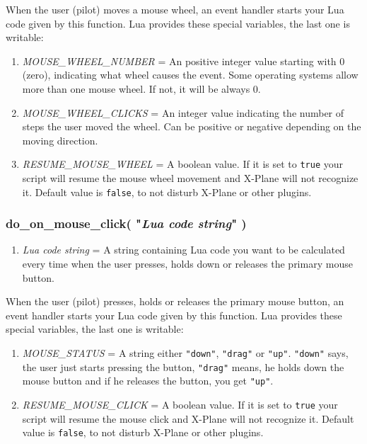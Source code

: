 \documentclass[11pt,parskip=half,a4paper]{scrartcl}
\begin{document}
When the user (pilot) moves a mouse wheel, an event handler starts your Lua code given by this function. Lua provides these special variables, the last one is writable:

\begin{enumerate}
	\item \emph{MOUSE\_WHEEL\_NUMBER} = An positive integer value starting with 0 (zero), indicating what wheel causes the event. Some operating systems allow more than one mouse wheel. If not, it will be always 0.
	\item \emph{MOUSE\_WHEEL\_CLICKS} = An integer value indicating the number of steps the user moved the wheel. Can be positive or negative depending on the moving direction.
	\item \emph{RESUME\_MOUSE\_WHEEL} = A boolean value. If it is set to \verb|true| your script will resume the mouse wheel movement and X-Plane will not recognize it. Default value is \verb|false|, to not disturb X-Plane or other plugins.
\end{enumerate}


\subsubsection{do\_on\_mouse\_click( "\emph{Lua code string}" )}

\begin{enumerate}
	\item \emph{Lua code string} = A string containing Lua code you want to be calculated every time when the user presses, holds down or releases the primary mouse button.
\end{enumerate}

When the user (pilot) presses, holds or releases the primary mouse button, an event handler starts your Lua code given by this function. Lua provides these special variables, the last one is writable:

\begin{enumerate}
	\item \emph{MOUSE\_STATUS} = A string either \verb|"down"|, \verb|"drag"| or \verb|"up"|. \verb|"down"| says, the user just starts pressing the button, \verb|"drag"| means, he holds down the mouse button and if he releases the button, you get \verb|"up"|.
	\item \emph{RESUME\_MOUSE\_CLICK} = A boolean value. If it is set to \verb|true| your script will resume the mouse click and X-Plane will not recognize it. Default value is \verb|false|, to not disturb X-Plane or other plugins.
\end{enumerate}
\end{document}
